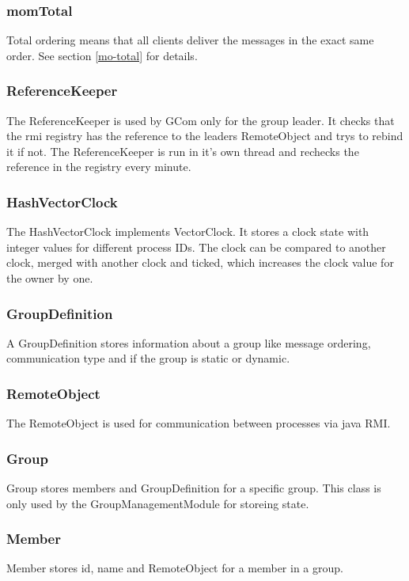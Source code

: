 \documentclass[english]{article}
\begin{document}
\subsubsection{momTotal}
Total ordering means that all clients deliver the messages in the exact same order. See section \vref{mo-total} for details.

\subsubsection{ReferenceKeeper}
The ReferenceKeeper is used by GCom only for the group leader. It checks that the rmi registry has the reference to the leaders RemoteObject and trys to rebind it if not. The ReferenceKeeper is run in it's own thread and rechecks the reference in the registry every minute.

\subsubsection{HashVectorClock}
The HashVectorClock implements VectorClock. It stores a clock state with integer values for different process IDs. The clock can be compared to another clock, merged with another clock and ticked, which increases the clock value for the owner by one.

\subsubsection{GroupDefinition}
A GroupDefinition stores information about a group like message ordering, communication type and if the group is static or dynamic. 

\subsubsection{RemoteObject}
The RemoteObject is used for communication between processes via java RMI. 

\subsubsection{Group}
Group stores members and GroupDefinition for a specific group. This class is only used by the GroupManagementModule for storeing state.

\subsubsection{Member}
Member stores id, name and RemoteObject for a member in a group.
\end{document}
